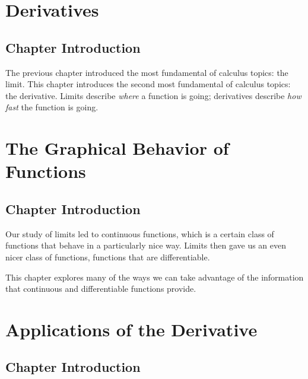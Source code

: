 \clearpage\thispagestyle{empty}\cleardoublepage
\chapter{Derivatives}\label{chapter:derivatives}
\thispagestyle{empty}
\iflatexml\section*{Chapter Introduction}\fi

The previous chapter introduced the most fundamental of calculus topics: the limit. This chapter introduces the second most fundamental of calculus topics: the derivative. Limits describe \textit{where} a function is going; derivatives describe \textit{how fast} the function is going.









\clearpage\thispagestyle{empty}\cleardoublepage
\chapter{The Graphical Behavior of Functions}\label{chapter:graphbehavior}
\thispagestyle{empty}
\iflatexml\section*{Chapter Introduction}\fi

Our study of limits led to continuous functions, which is a certain class of functions that behave in a particularly nice way. Limits then gave us an even nicer class of functions, functions that are differentiable.

This chapter explores many of the ways we can take advantage of the information that continuous and differentiable functions  provide.








\clearpage\thispagestyle{empty}\cleardoublepage
\chapter{Applications of the Derivative}\label{chapter:deriv_apps}
\thispagestyle{empty}
\iflatexml\section*{Chapter Introduction}\fi

